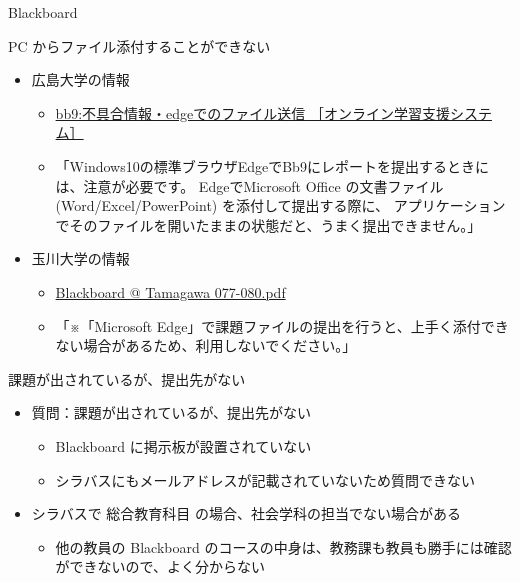 \documentclass[a4j,10pt]{jsarticle}
\begin{document}
{\begin{frame}[label={sec:orgc119bb0},fragile]{Blackboard}
\begin{block}{PC からファイル添付することができない}
\begin{itemize}
\begin{itemize}
\item \url{https://www.mozilla.org/ja/firefox/new/}
\end{itemize}
\par
\item 広島大学の情報
\begin{itemize}
\item \href{https://support.vle.hiroshima-u.ac.jp/bb9:\%E4\%B8\%8D\%E5\%85\%B7\%E5\%90\%88\%E6\%83\%85\%E5\%A0\%B1\%E3\%83\%BBedge\%E3\%81\%A7\%E3\%81\%AE\%E3\%83\%95\%E3\%82\%A1\%E3\%82\%A4\%E3\%83\%AB\%E9\%80\%81\%E4\%BF\%A1}{bb9:不具合情報・edgeでのファイル送信 ［オンライン学習支援システム］}
\item 「Windows10の標準ブラウザEdgeでBb9にレポートを提出するときには、注意が必要です。
EdgeでMicrosoft Office の文書ファイル (Word/Excel/PowerPoint) を添付して提出する際に、
アプリケーションでそのファイルを開いたままの状態だと、うまく提出できません。」
\end{itemize}
\end{itemize}
\par
\begin{itemize}
\item 玉川大学の情報
\begin{itemize}
\item \href{https://www.tamagawa.ac.jp/student\_guidebook/2020/pdf/03/077-080.pdf}{Blackboard @ Tamagawa 077-080.pdf}
\item 「※「Microsoft Edge」で課題ファイルの提出を行うと、上手く添付できない場合があるため、利用しないでください。」
\end{itemize}
\end{itemize}
\end{block}
\par
\begin{block}{課題が出されているが、提出先がない}
\begin{itemize}
\item 質問：課題が出されているが、提出先がない
\begin{itemize}
\item Blackboard に掲示板が設置されていない
\item シラバスにもメールアドレスが記載されていないため質問できない
\end{itemize}
\par
\item シラバスで \alert{総合教育科目} の場合、社会学科の担当でない場合がある
\begin{itemize}
\item 他の教員の Blackboard のコースの中身は、教務課も教員も勝手には確認ができないので、よく分からない

\end{itemize}
\end{itemize}
\end{block}
\end{frame}}
\end{document}
